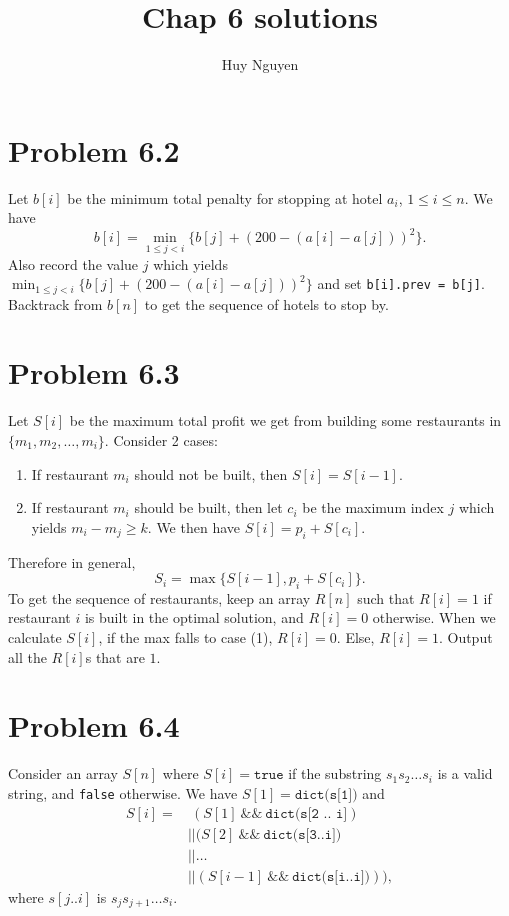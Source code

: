 \documentclass[12pt]{article}
\title{Chap 6 solutions}
\author{Huy Nguyen}
\newcommand{\co}{\texttt}
\renewcommand{\and}{\ \&\& \ }
\begin{document}
\section{Problem 6.2}
Let $b[i]$ be the minimum total penalty for stopping at hotel $a_i$, $1 \le i \le n$. We have $$b[i] = \min_{1 \le j < i} \{ b[j] + (200 - (a[i] - a[j]))^2\}.$$
Also record the value $j$ which yields $\displaystyle \min_{1 \le j < i} \{ b[j] + (200 - (a[i] - a[j]))^2\}$ and set \co{b[i].prev = b[j]}. Backtrack from $b[n]$ to get the sequence of hotels to stop by.

\section{Problem 6.3}
Let $S[i]$ be the maximum total profit we get from building some restaurants in $\{m_1, m_2, \ldots, m_i\}$. Consider 2 cases:
\begin{enumerate}[(1)]
	\item If restaurant $m_i$ should not be built, then $S[i] = S[i-1]$.
	\item If restaurant $m_i$ should be built, then let $c_i$ be the maximum index $j$ which yields $m_i - m_j \ge k$. We then have $\displaystyle S[i] = p_i + S[c_i]$.
\end{enumerate}
Therefore in general, $$S_i = \max \{ S[i-1], p_i + S[c_i]\}.$$
To get the sequence of restaurants, keep an array $R[n]$ such that $R[i] = 1$ if restaurant $i$ is built in the optimal solution, and $R[i] = 0$ otherwise. When we calculate $S[i]$, if the max falls to case (1), $R[i] = 0$. Else, $R[i] = 1$. Output all the $R[i]$s that are $1$.

\section{Problem 6.4}
Consider an array $S[n]$ where $S[i] = \co{true}$ if the substring $s_1 s_2 \ldots s_i$ is a valid string, and \co{false} otherwise. We have $S[1] = \co{dict(s[1])}$ and 
$$
\begin{aligned}
S[i] = & \ (S[1] \and \co{dict(s[2 .. i]}) \\ 
& || (S[2] \and \co{dict(s[3..i])} \\ 
& || \ldots \\
& || (S[i-1] \and \co{dict(s[i..i])})), 
\end{aligned}$$
where $s[j..i]$ is $s_j s_{j+1} \ldots s_i$.
\end{document}
